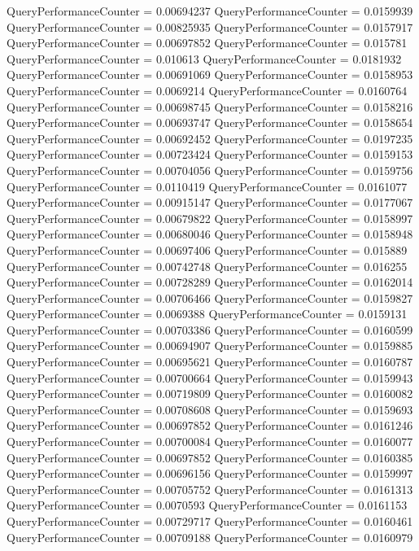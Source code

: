\documentclass[9pt]{article}
\theoremstyle{plain}
\theoremstyle{definition}
\theoremstyle{remark}
\numberwithin{equation}{section}
\begin{document}
QueryPerformanceCounter  =  0.00694237
QueryPerformanceCounter  =  0.0159939
QueryPerformanceCounter  =  0.00825935
QueryPerformanceCounter  =  0.0157917
QueryPerformanceCounter  =  0.00697852
QueryPerformanceCounter  =  0.015781
QueryPerformanceCounter  =  0.010613
QueryPerformanceCounter  =  0.0181932
QueryPerformanceCounter  =  0.00691069
QueryPerformanceCounter  =  0.0158953
QueryPerformanceCounter  =  0.0069214
QueryPerformanceCounter  =  0.0160764
QueryPerformanceCounter  =  0.00698745
QueryPerformanceCounter  =  0.0158216
QueryPerformanceCounter  =  0.00693747
QueryPerformanceCounter  =  0.0158654
QueryPerformanceCounter  =  0.00692452
QueryPerformanceCounter  =  0.0197235
QueryPerformanceCounter  =  0.00723424
QueryPerformanceCounter  =  0.0159153
QueryPerformanceCounter  =  0.00704056
QueryPerformanceCounter  =  0.0159756
QueryPerformanceCounter  =  0.0110419
QueryPerformanceCounter  =  0.0161077
QueryPerformanceCounter  =  0.00915147
QueryPerformanceCounter  =  0.0177067
QueryPerformanceCounter  =  0.00679822
QueryPerformanceCounter  =  0.0158997
QueryPerformanceCounter  =  0.00680046
QueryPerformanceCounter  =  0.0158948
QueryPerformanceCounter  =  0.00697406
QueryPerformanceCounter  =  0.015889
QueryPerformanceCounter  =  0.00742748
QueryPerformanceCounter  =  0.016255
QueryPerformanceCounter  =  0.00728289
QueryPerformanceCounter  =  0.0162014
QueryPerformanceCounter  =  0.00706466
QueryPerformanceCounter  =  0.0159827
QueryPerformanceCounter  =  0.0069388
QueryPerformanceCounter  =  0.0159131
QueryPerformanceCounter  =  0.00703386
QueryPerformanceCounter  =  0.0160599
QueryPerformanceCounter  =  0.00694907
QueryPerformanceCounter  =  0.0159885
QueryPerformanceCounter  =  0.00695621
QueryPerformanceCounter  =  0.0160787
QueryPerformanceCounter  =  0.00700664
QueryPerformanceCounter  =  0.0159943
QueryPerformanceCounter  =  0.00719809
QueryPerformanceCounter  =  0.0160082
QueryPerformanceCounter  =  0.00708608
QueryPerformanceCounter  =  0.0159693
QueryPerformanceCounter  =  0.00697852
QueryPerformanceCounter  =  0.0161246
QueryPerformanceCounter  =  0.00700084
QueryPerformanceCounter  =  0.0160077
QueryPerformanceCounter  =  0.00697852
QueryPerformanceCounter  =  0.0160385
QueryPerformanceCounter  =  0.00696156
QueryPerformanceCounter  =  0.0159997
QueryPerformanceCounter  =  0.00705752
QueryPerformanceCounter  =  0.0161313
QueryPerformanceCounter  =  0.0070593
QueryPerformanceCounter  =  0.0161153
QueryPerformanceCounter  =  0.00729717
QueryPerformanceCounter  =  0.0160461
QueryPerformanceCounter  =  0.00709188
QueryPerformanceCounter  =  0.0160979
\end{document}
